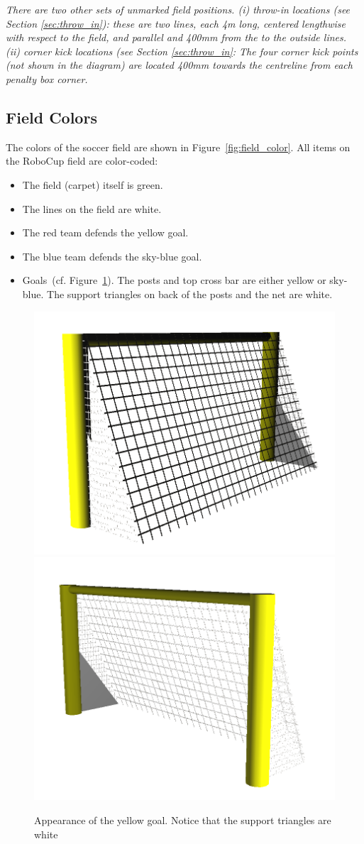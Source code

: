 \documentclass[12pt]{article}
\newcommand{\cf}{\mbox{cf.}\xspace}
\begin{document}

\emph{There are two other sets of unmarked field positions.
(i) throw-in locations (see Section \ref{sec:throw_in}): these are two lines, each 4m long, centered lengthwise with respect to the field, and parallel and 400mm from the to the outside lines.
(ii) corner kick locations (see Section \ref{sec:throw_in}: 
The four corner kick points (not shown in the diagram) are located 400mm towards the centreline from each penalty box corner.
}
\subsection{Field Colors}

The colors of the soccer field are shown in
Figure~\ref{fig:field_color}. All items on the RoboCup field are
color-coded:

\begin{itemize}
\item The field (carpet) itself is green.
\item The lines on the field are white.
\item The red team defends the yellow goal.
\item The blue team defends the sky-blue goal.
\item Goals~(\cf Figure~\ref{fig:goal_colors}). The posts and top cross
  bar are either yellow or sky-blue. The support triangles on back of the posts and the net are white.
\end{itemize}

\begin{figure}[htp]
\begin{center}
    \leavevmode
    \includegraphics[width=0.45\columnwidth]{figs/GoalBack}
    \includegraphics[width=0.45\columnwidth]{figs/GoalFront}
    \caption{Appearance of the yellow goal. Notice that the support triangles are white}
    \label{fig:goal_colors}
\end{center}
\end{figure}
\end{document}

